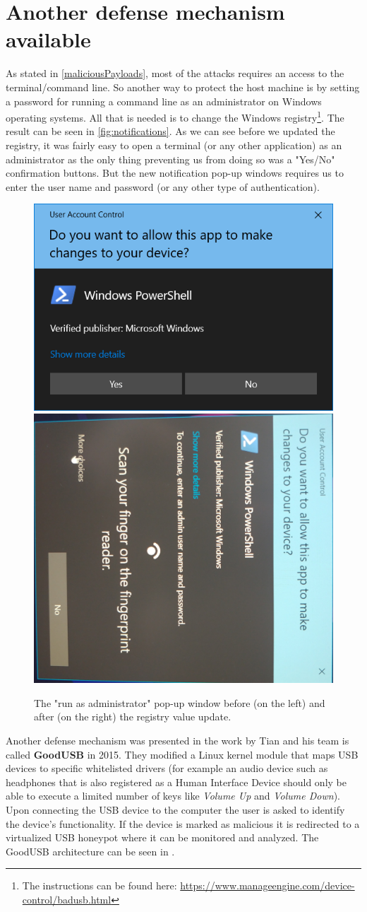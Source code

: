 \section{Another defense mechanism available}
As stated in \autoref{maliciousPayloads}, most of the attacks requires an access to the terminal/command line. So another way to protect the host machine is by setting a password for running a command line as an administrator on Windows operating systems. All that is needed is to change the Windows registry\footnote{The instructions can be found here: \url{https://www.manageengine.com/device-control/badusb.html}}. The result can be seen in \autoref{fig:notifications}. As we can see before we updated the registry, it was fairly easy to open a terminal (or any other application) as an administrator as the only thing preventing us from doing so was a "Yes/No" confirmation buttons. But the new notification pop-up windows requires us to enter the user name and password (or any other type of authentication).
\begin{figure}[ht]
    \centering
    \includegraphics[width=0.48\linewidth]{./obrazky-figures/basic_notification.PNG}
    \includegraphics[width=0.48\linewidth]{./obrazky-figures/notification_with_authentication.jpg}
    \caption{The "run as administrator" pop-up window before (on the left) and after (on the right) the registry value update.}
    \label{fig:notifications}
\end{figure}

Another defense mechanism was presented in the work \cite{goodusb} by Tian and his team is called \textbf{GoodUSB} in 2015. They modified a Linux kernel module that maps USB devices to specific whitelisted drivers (for example an audio device such as headphones that is also registered as a Human Interface Device should only be able to execute a limited number of keys like \emph{Volume Up} and \emph{Volume Down}). Upon connecting the USB device to the computer the user is asked to identify the device's functionality. If the device is marked as malicious it is redirected to a virtualized USB honeypot where it can be monitored and analyzed. The GoodUSB architecture can be seen in .

